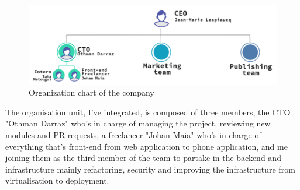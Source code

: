 \begin{figure}[!htpb]
    \centering
    \includegraphics[width=\textwidth]{images/Hierarchy.png}
    \caption{\footnotesize{Organization chart of the company}}
    \label{fig:core_activities_2}
\end{figure}

The organisation unit, I've integrated, is composed of three members,
the CTO "Othman Darraz" who's in charge of managing the project, reviewing new modules
and PR requests, a freelancer "Johan Maia" who's in charge of everything that's front-end
from web application to phone application, and me joining them as the third member of the
team to partake in the backend and infrastructure mainly refactoring, security and
improving the infrastructure from virtualisation to deployment.

